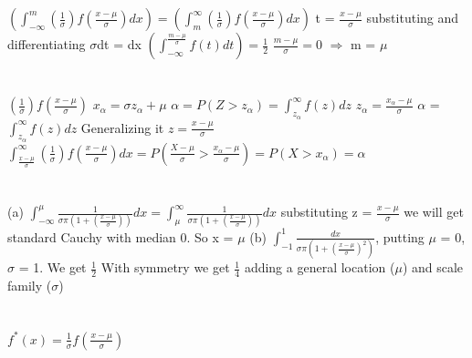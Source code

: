 \documentclass{report}
\begin{document}
\section{}
$\left(\int_{-\infty}^{m}(\frac{1}{\sigma})f(\frac{x - \mu}{\sigma})dx\right) = \left(\int_{m}^{\infty}(\frac{1}{\sigma})f(\frac{x - \mu}{\sigma})dx\right)$
\newline
t = $\frac{x - \mu}{\sigma}$
substituting and differentiating
\newline
$\sigma$dt = dx
\newline
$\left(\int_{-\infty}^{\frac{m-\mu}{\sigma}}f(t)dt\right) = \frac{1}{2}$
\newline
$\frac{m - \mu}{\sigma} = 0$ $\Rightarrow$ m = $\mu$
\newline

\section{}
$(\frac{1}{\sigma})f(\frac{x - \mu}{\sigma})$
\newline
$x_{\alpha} = \sigma z_{\alpha} + \mu$
\newline
$\alpha = P(Z > z_\alpha) = \int_{z_\alpha}^{\infty}f(z)dz$
\newline
$z_{\alpha} = \frac{x_{\alpha} - \mu}{\sigma}$
$\alpha$ = $\int_{z_{\alpha}}^{\infty}f(z)dz$
\newline
Generalizing it $z = \frac{x - \mu}{\sigma}$
$\int_{\frac{x - \mu}{\sigma}}^{\infty}(\frac{1}{\sigma})f(\frac{x - \mu}{\sigma})dx = P(\frac{X - \mu}{\sigma} > \frac{x_{\alpha} - \mu}{\sigma}) = P(X > x_{\alpha}) = \alpha$
\newline

\section{}
(a) $\int_{-\infty}^{\mu}\frac{1}{\sigma \pi (1 + (\frac{x - \mu}{\sigma}))}dx = \int_{\mu}^{\infty}\frac{1}{\sigma \pi (1 + (\frac{x - \mu}{\sigma}))}dx$
substituting z = $\frac{x - \mu}{\sigma}$
\newline
we will get standard Cauchy with median 0. So x = $\mu$
\newline
(b) $\int_{-1}^{1}\frac{dx}{\sigma \pi \left(1 + \left(\frac{x - \mu}{\sigma}\right)^2\right)}$, putting $\mu$ = 0, $\sigma$ = 1.
We get $\frac{1}{2}$ With symmetry we get $\frac{1}{4}$  adding a general location ($\mu$) and scale family ($\sigma$)
\newline

\section{}
$f^*(x) = \frac{1}{\sigma}f(\frac{x - \mu}{\sigma})$
\newline
\end{document}
